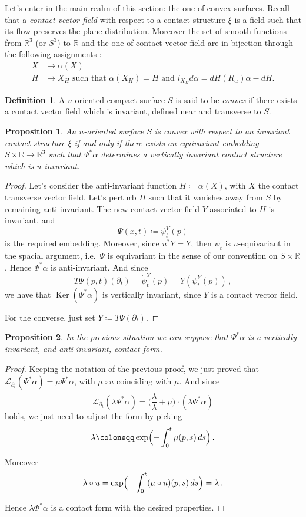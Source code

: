\documentclass[a4paper, 11pt]{amsart}
\theoremstyle{plain}
\newtheorem{prop}{Proposition}[section]
\theoremstyle{definition}
\newtheorem{defin}[defin]{Definition}
\newcommand{\R}{\mathbb{R}}
\newcommand{\Lie}{\mathcal{L}}
\DeclareMathOperator{\Ker}{Ker}
\begin{document}
Let's enter in the main realm of this section: the one of convex surfaces. Recall that a \emph{contact vector field} with respect to a contact structure $\xi$ is a field such that its flow preserves the plane distribution. Moreover the set of smooth functions from $\R^3$ (or $S^3$) to $\R$ and the one of contact vector field are in bijection through the following assignments \cite[Thm.\ 2.3.1]{geigesIntroductionContactTopology2008}:
\[
\begin{split}
	 X &\mapsto \alpha(X)\\
	 H &\mapsto X_H \text{ such that } \alpha(X_H) = H \text{ and } i_{X_H} d\alpha = dH(R_\alpha)\alpha-dH.	 
\end{split}
\]
\begin{defin}
	A $u$-oriented compact surface $S$ is said to be \emph{convex} if there exists a contact vector field which is invariant, defined near and transverse to $S$.
\end{defin}
\begin{prop}
	An $u$-oriented surface $S$ is convex with respect to an invariant contact structure $\xi$ if and only if there exists an equivariant embedding $S \times \R \to \R^3 $ such that $\Psi^*\alpha$ determines a vertically invariant contact structure which is $u$-invariant.
\end{prop}
\begin{proof}
	Let's consider the anti-invariant function $H \coloneqq \alpha(X)$, with $X$ the contact transverse vector field. Let's perturb $H$ such that it vanishes away from $S$ by remaining anti-invariant. The new contact vector field $Y$ associated to $H$ is invariant, and
	\[
		\Psi(x,t) \coloneqq \psi_t^Y(p)
	\]
	is the required embedding. Moreover, since $u^*Y = Y$, then $\psi_t$ is $u$-equivariant in the spacial argument, i.e.\ $\Psi$ is equivariant in the sense of our convention on $S \times \R$. Hence $\Psi^*\alpha$ is anti-invariant. And since
	\[
		T\Psi(p,t)(\partial_t)= \dot{\psi}^Y_t(p)= Y(\psi^Y_t(p))\,,
	\]
	we have that $\Ker(\Psi^*\alpha)$ is vertically invariant, since $Y$ is a contact vector field.
	
	For the converse, just set $Y \coloneqq T\Psi(\partial_t)$.
\end{proof}
\begin{prop}
	In the previous situation we can suppose that $\Psi^*\alpha$ is a vertically invariant, and anti-invariant, contact form.
\end{prop}
\begin{proof}
	Keeping the notation of the previous proof, we just proved that $\Lie_{\partial_t}(\Psi^*\alpha) = \mu \Psi^*\alpha$, with $\mu\circ u$ coinciding with $\mu$. And since
	\[
		\Lie_{\partial_t}(\lambda \Psi^*\alpha) = \biggl(\frac{\dot\lambda}{\lambda} + \mu\biggr)\cdot(\lambda\Psi^*\alpha)
	\]
	holds, we just need to adjust the form by picking 
	\[
		\lambda \coloneqq \exp\Bigl(-\int_0^t\mu(p,s)\,ds\Bigr)\,.
	\]
	
	Moreover
	\[
		\lambda \circ u = \exp\Bigl(-\int_0^t(\mu \circ u)(p,s)\,ds\Bigr) = \lambda\,.
	\]
	
	Hence $\lambda\Phi^*\alpha$ is a contact form with the desired properties.
\end{proof}
\end{document}
